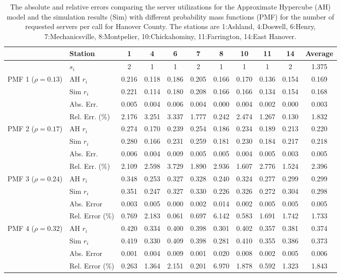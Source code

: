 \documentclass[11pt]{article}\topmargin 0mm
\begin{document}
\begin{table}
\footnotesize \centering \caption{The absolute and relative
errors comparing the server utilizations for the Approximate
Hypercube (AH) model and the simulation results (Sim) with
different probability mass functions (PMF) for the number of
requested servers per call for Hanover County. The stations are
1:Ashland, 4:Doswell, 6:Henry, 7:Mechanicsville, 8:Montpelier,
10:Chickahominy, 11:Farrington, 14:East Hanover.
\label{tbl:hanover_results}} {\begin{tabular}{c l c c c c c c c
c c} \hline
 & Station & 1 & 4 & 6 & 7 & 8 & 10 & 11 & 14 & Average \\
\hline
 & $s_i$ & 2 & 1 & 1 & 2 & 1 & 1 & 1 & 2 & 1.375 \\
\hline
\multirow{4}{0.7in}{PMF 1 ($\rho=0.13$)} & AH $r_i$ & 0.216 & 0.118 & 0.186 & 0.205 & 0.166 & 0.170 & 0.136 & 0.154 & 0.169 \\
 & Sim $r_i$ & 0.221 & 0.114 & 0.180 & 0.208 & 0.166 & 0.166 & 0.134 & 0.154 & 0.168 \\
 & Abs. Err. & 0.005 & 0.004 & 0.006 & 0.004 & 0.000 & 0.004 & 0.002 & 0.000 & 0.003 \\
 & Rel. Err. (\%) & 2.176 & 3.251 & 3.337 & 1.777 & 0.242 & 2.474 & 1.267 & 0.130 & 1.832 \\
\hline
\multirow{4}{0.7in}{PMF 2 ($\rho=0.17$)} & AH $r_i$ & 0.274 & 0.170 & 0.239 & 0.254 & 0.186 & 0.234 & 0.189 & 0.213 & 0.220 \\
 & Sim $r_i$ & 0.280 & 0.166 & 0.231 & 0.259 & 0.181 & 0.230 & 0.184 & 0.217 & 0.218 \\
 & Abs. Err. & 0.006 & 0.004 & 0.009 & 0.005 & 0.005 & 0.004 & 0.005 & 0.003 & 0.005 \\
 & Rel. Err. (\%) & 2.109 & 2.598 & 3.729 & 1.890 & 2.936 & 1.607 & 2.776 & 1.524 & 2.396 \\
\hline
\multirow{4}{0.7in}{PMF 3 ($\rho=0.24$)} & AH $r_i$ & 0.348 & 0.253 & 0.327 & 0.328 & 0.240 & 0.324 & 0.277 & 0.299 & 0.299 \\
 & Sim $r_i$ & 0.351 & 0.247 & 0.327 & 0.330 & 0.226 & 0.326 & 0.272 & 0.304 & 0.298 \\
 & Abs. Error & 0.003 & 0.005 & 0.000 & 0.002 & 0.014 & 0.002 & 0.005 & 0.005 & 0.005 \\
 & Rel. Error (\%) & 0.769 & 2.183 & 0.061 & 0.697 & 6.142 & 0.583 & 1.691 & 1.742 & 1.733 \\
\hline
\multirow{4}{0.7in}{PMF 4 ($\rho=0.32$)} & AH $r_i$ & 0.420 & 0.334 & 0.400 & 0.398 & 0.301 & 0.402 & 0.357 & 0.381 & 0.374 \\
 & Sim $r_i$ & 0.419 & 0.330 & 0.409 & 0.398 & 0.281 & 0.410 & 0.355 & 0.386 & 0.373 \\
 & Abs. Error & 0.001 & 0.004 & 0.009 & 0.001 & 0.020 & 0.008 & 0.002 & 0.005 & 0.006 \\
 & Rel. Error (\%) & 0.263 & 1.364 & 2.151 & 0.201 & 6.970 & 1.878 & 0.592 & 1.323 & 1.843 \\
\hline
\end{tabular}}
\end{table}
\end{document}
